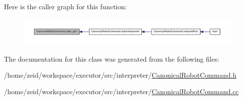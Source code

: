 Here is the caller graph for this function:
\nopagebreak
\begin{figure}[H]
\begin{center}
\leavevmode
\includegraphics[width=400pt]{class_canonical_robot_command_afb89d61a62c1dea47f5abef6b5ec1b4e_icgraph}
\end{center}
\end{figure}




The documentation for this class was generated from the following files:\begin{DoxyCompactItemize}
\item 
/home/zeid/workspace/executor/src/interpreter/\hyperlink{_canonical_robot_command_8h}{CanonicalRobotCommand.h}\item 
/home/zeid/workspace/executor/src/interpreter/\hyperlink{_canonical_robot_command_8cc}{CanonicalRobotCommand.cc}\end{DoxyCompactItemize}
